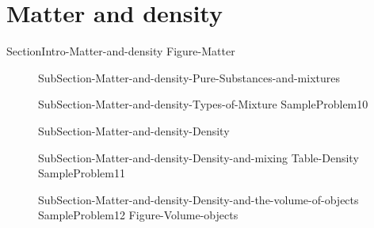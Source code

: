 \documentclass[main.tex]{subfiles}
\begin{document}
\newpage
\section{Matter and density}
{SectionIntro-Matter-and-density}
{Figure-Matter}		
\sloppy\begin{description}
\item[]{SubSection-Matter-and-density-Pure-Substances-and-mixtures}
\item[]{SubSection-Matter-and-density-Types-of-Mixture}
{SampleProblem10}
\item[]{SubSection-Matter-and-density-Density}
\item[]{SubSection-Matter-and-density-Density-and-mixing}
{Table-Density} 
{SampleProblem11}
\item[]{SubSection-Matter-and-density-Density-and-the-volume-of-objects}
{SampleProblem12}
{Figure-Volume-objects}
\end{description}
\end{document}
